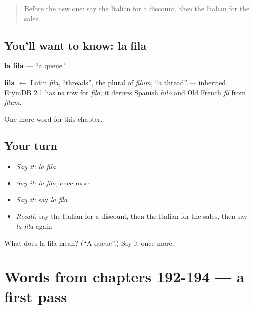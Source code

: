 \begin{quote}
Before the new one: say the Italian for a discount, then the Italian for the sales.
\end{quote}

\subsection*{You'll want to know: la fila}
\textbf{la fila} — \textquotedblleft{}a queue\textquotedblright{}.

\begin{cousinweb}
\textbf{fila} $\leftarrow$ Latin \emph{fila}, \textquotedblleft{}threads\textquotedblright{}, the plural of \emph{filum}, \textquotedblleft{}a thread\textquotedblright{} — inherited. EtymDB 2.1 has no row for \emph{fila}; it derives Spanish \emph{hilo} and Old French \emph{fil} from \emph{filum}.
\end{cousinweb}

\begin{grammarlens}[title={What you've built}]
One more word for this chapter.
\end{grammarlens}

\subsection*{Your turn}
\begin{itemize}
\raggedright
  \item \emph{Say it:} \emph{la fila}
  \item \emph{Say it:} \emph{la fila}, once more
  \item \emph{Say it:} say \emph{la fila}
  \item \emph{Recall:} say the Italian for a discount, then the Italian for the sales, then say \emph{la fila} again
\end{itemize}

\begin{tcolorbox}[breakable,colback=teal!4,colframe=teal!35!black,title={Before you move on}]
What does la fila mean? (\textquotedblleft{}A queue\textquotedblright{}.) Say it once more.
\end{tcolorbox}
\section[(dialogue)]{Words from chapters 192-194 — a first pass}

\label{lesson:IT-R197-first-pass-words-from-chapters-192-194}



